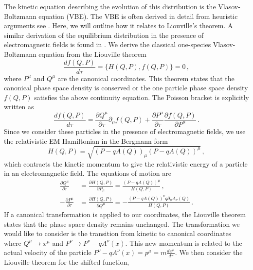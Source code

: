 The kinetic equation describing the evolution of this distribution is the Vlasov-Boltzmann equation (VBE). The VBE is often derived in detail from heuristic arguments see \cite{DeGroot:1980dk,Cercignani:2002bk}. Here, we will outline how it relates to Liouville's theorem. A similar derivation of the equilibrium distribution in the presence of electromagnetic fields is found in \cite{Hakim:2011bk}.
We derive the classical one-species Vlasov-Boltzmann equation from the Liouville theorem
\begin{equation}
    \frac{d f(Q,P)}{d\tau} = \{H(Q,P), f(Q,P)\} = 0\,,
\end{equation}
where $P^{\mu}$ and $Q^{\mu}$ are the canonical coordinates. 
This theorem states that the canonical phase space density is conserved or the one particle phase space density $f(Q,P)$ satisfies the above continuity equation.  The Poisson bracket is explicitly written as 
\begin{equation}
    \frac{d f(Q,P)}{d\tau} = \frac{\partial Q^{\mu}}{\partial \tau}\partial_\mu f(Q,P) + \frac{\partial P^{\mu}}{\partial \tau}\frac{\partial f(Q,P)}{\partial P^{\mu}}\,.
\end{equation}
Since we consider these particles in the presence of electromagnetic fields, we use the relativistic EM Hamiltonian in the Bergmann form
\begin{equation}
    H(Q,P) = \sqrt{(P-q A(Q))_\mu(P-q A(Q))^\mu}\,,
\end{equation}
which contracts the kinetic momentum to give the relativistic energy of a particle in an electromagnetic field. The equations of motion are
\begin{align}
    \frac{\partial Q^{\mu}}{\partial \tau} &= \frac{\partial H(Q,P)}{\partial P_{\mu}}= \frac{(P-q A(Q))^{\mu}}{H(Q,P)}\,,\\
   -\frac{\partial P^{\mu}}{\partial \tau} &= \frac{\partial H(Q,P)}{\partial Q^{\mu}}= - \frac{(P-q A(Q))^{\nu}q \partial_\mu A_\nu(Q)}{H(Q,P)}\,.
\end{align}
If a canonical transformation is applied to our coordinates, the Liouville theorem states that the phase space density remains unchanged. 
The transformation we would like to consider is the transition from kinetic to canonical coordinates where $Q^{\mu}\rightarrow x^{\mu}$ and  $P^{\nu} \rightarrow P^{\nu} - q A^{\nu}(x)$. This new momentum is related to the actual velocity of the particle $P^{\nu} - q A^{\nu}(x) = p^{\mu} = m\frac{d x^{\mu}}{d \tau}$.  We then consider the Liouville theorem for the shifted function,  
